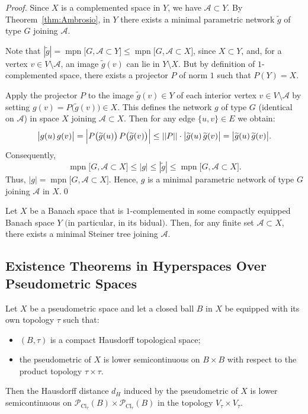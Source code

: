 \documentclass{svproc}
\def\Cl{\operatorname{Cl}}
\def\mpn{\operatorname{mpn}}
\begin{document}
\begin{proof}

Since $X$ is a complemented space in $Y$, we have $\mathcal{A}\subset Y$. By Theorem~\ref{thm:Ambrosio}, in $Y$ there exists a minimal parametric network $\widetilde{g}$ of type $G$ joining $\mathcal{A}$. 

Note that $|\widetilde{g}| = \mpn\bigl[G, \mathcal{A}\subset Y\bigr]\le \mpn\bigl[G, \mathcal{A}\subset X\bigr]$, since $X\subset Y$, and, for a vertex $v\in V\setminus \mathcal{A}$, an image $\widetilde{g}(v)$ can lie in $Y\setminus X$. But by definition of $1$-complemented space, there exists a projector $P$ of norm $1$ such that $P(Y) = X$.

Apply the projector $P$ to the image $\widetilde{g}(v)\in Y$ of each interior vertex $v\in V\setminus \mathcal{A}$ by setting $g(v) = P\bigl(\widetilde{g}(v)\bigr)\in X$. This defines the network $g$ of type $G$ (identical on $\mathcal{A}$) in space $X$ joining $\mathcal{A}\subset X$. Then for any edge $\{u, v\}\in E$ we obtain:
$$
\bigl|g(u)\, g(v)\bigr| = \Bigl|P\bigl(\widetilde{g}(u)\bigr)\, P\bigl(\widetilde{g}(v)\bigr)\Bigr| \le ||P||\cdot \bigl|\widetilde{g}(u)\, \widetilde{g}(v)\bigr| = \bigl|\widetilde{g}(u)\, \widetilde{g}(v)\bigr|.
$$
Consequently,
$$
\mpn\bigl[G, \mathcal{A}\subset X\bigr] \le |g| \le |\widetilde{g}| \le \mpn\bigl[G, \mathcal{A}\subset X\bigr].
$$
Thus, $|g| = \mpn\bigl[G, \mathcal{A}\subset X\bigr]$. Hence, $g$ is a minimal parametric network of type $G$ joining $\mathcal{A}$ in $X$.\qed

\end{proof}

\begin{corollary}\label{cor:gen}
Let $X$ be a Banach space that is $1$-complemented in some compactly equipped Banach space $Y$ $($in particular, in its bidual$)$. Then, for any finite set $\mathcal{A}\subset X$, there exists a minimal Steiner tree joining $\mathcal{A}$. 
\end{corollary}


\subsection{Existence Theorems in Hyperspaces Over Pseudometric Spaces}\label{sec:hyp_pseudo}

\begin{theorem}\label{thm:dH_semicont}
Let $X$ be a pseudometric space and let a closed ball $B$ in $X$ be equipped with its own topology $\tau$ such that$:$
\begin{itemize}
\item $(B, \tau)$ is a compact Hausdorff topological space$;$
\item the pseudometric of $X$ is lower semicontinuous on $B\times B$ with respect to the product topology $\tau\times \tau$.
\end{itemize}
Then the Hausdorff distance $d_H$ induced by the pseudometric of $X$ is lower semicontinuous on $\mathcal{P}_{\Cl_{\tau}}(B)\times \mathcal{P}_{\Cl_{\tau}}(B)$ in the topology $V_{\tau}\times V_{\tau}$.
\end{theorem}
\end{document}

